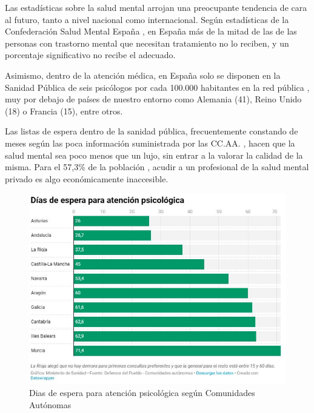 Las estadísticas sobre la salud mental arrojan una preocupante tendencia de cara al futuro, tanto a nivel nacional como internacional. Según estadísticas de la Confederación Salud Mental España \cite{confederacion_salud_mental_espana_salud_nodate} \cite{aguilar_laura_2022},  en España más de la mitad de las de las personas con trastorno mental que necesitan tratamiento no lo reciben, y un porcentaje significativo no recibe el adecuado. 

Asimismo, dentro de la atención médica, en España solo se disponen en la Sanidad Pública de seis psicólogos por cada 100.000 habitantes en la red pública \cite{antolin_listas_2023}, muy por debajo de países de nuestro entorno como Alemania (41), Reino Unido (18) o Francia (15), entre otros. 

Las listas de espera dentro de la sanidad pública, frecuentemente constando de meses según las poca información suministrada por las CC.AA. \cite{asuar_gallego_recurrir_2021} \cite{pascual_listas_2021}, hacen que la salud mental sea poco menos que un lujo, sin entrar a la valorar la calidad de la misma. Para el 57,3\% de la población  \cite{comunicacion_cuatro_2023}, acudir a un profesional de la salud mental privado es algo económicamente inaccesible.

\begin{figure}[h]
    \centering
    \includegraphics[width=1\linewidth]{figures/dias espera.JPG}
    \caption{Dias de espera para atención psicológica según Comunidades Autónomas \cite{asuar_gallego_recurrir_2021}}
    \label{fig:intro:dias_espera}
\end{figure}

